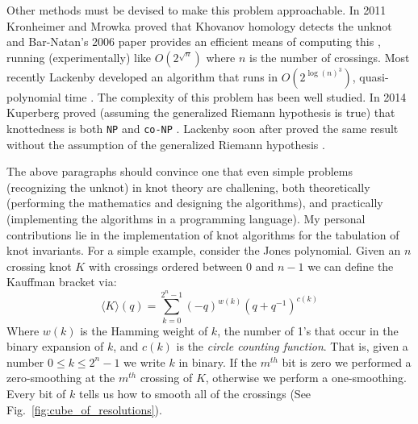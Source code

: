\documentclass{article}
\theoremstyle{plain}
\begin{document}
        Other methods must be devised to make this problem approachable.
        In 2011 Kronheimer and Mrowka proved that Khovanov homology detects the
        unknot \cite{KronheimerMrowka2011KhovanovUnknot} and Bar-Natan's 2006
        paper provides an efficient means of computing this
        \cite{BarNatan2006FASTKH}, running (experimentally) like
        $O(2^{\sqrt{n}})$ where $n$ is the number of crossings. Most recently
        Lackenby developed an algorithm that runs in
        $O(2^{\log(n)^{3}})$, quasi-polynomial time
        \cite{LackenBy2021QuasiPolyUnknotting}. The complexity of this problem
        has been well studied. In 2014 Kuperberg proved (assuming the generalized
        Riemann hypothesis is true) that knottedness is both \texttt{NP} and
        \texttt{co-NP} \cite{Kuperberg2014KnottednessNP}. Lackenby soon after
        proved the same result without the assumption of the generalized
        Riemann hypothesis \cite{Lackenby2021UnknotNP}.
        \par\hfill\par
        The above paragraphs should convince one that even simple problems
        (recognizing the unknot) in knot theory are challening,
        both theoretically (performing the mathematics and designing the
        algorithms), and practically (implementing the algorithms
        in a programming language).
        My personal contributions lie in the implementation of knot algorithms
        for the tabulation of knot invariants. For a simple example,
        consider the Jones polynomial. Given an $n$ crossing knot $K$
        with crossings ordered between $0$ and $n-1$ we can define the
        Kauffman bracket via:
        \begin{equation}
            \langle{K}\rangle(q)
            =\sum_{k=0}^{2^{n}-1}(-q)^{w(k)}(q+q^{-1})^{c(k)}
        \end{equation}
        Where $w(k)$ is the Hamming weight of $k$, the number of 1's that occur
        in the binary expansion of $k$, and $c(k)$ is the
        \textit{circle counting function}. That is, given a number
        $0\leq{k}\leq{2}^{n}-1$ we write $k$ in binary. If the $m^{th}$ bit is
        zero we performed a zero-smoothing at the $m^{th}$ crossing of $K$,
        otherwise we perform a one-smoothing. Every bit of $k$ tells us how to
        smooth all of the crossings (See Fig.~\ref{fig:cube_of_resolutions}).
\end{document}

